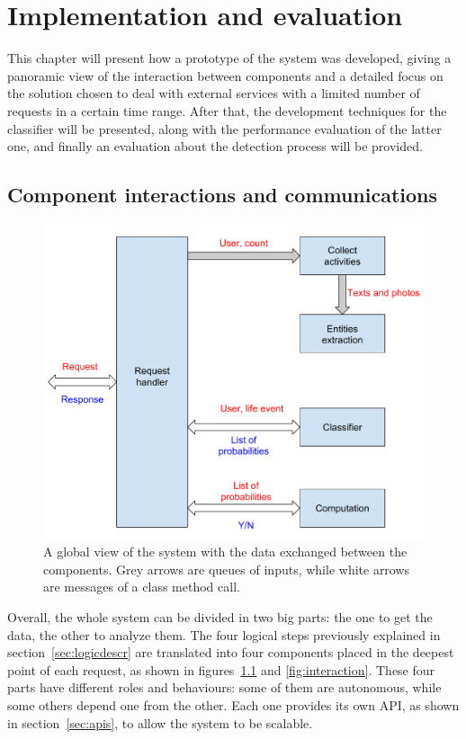 \chapter{Implementation and evaluation}
\label{cha:results}
This chapter will present how a prototype of the system was developed, giving a panoramic view of the interaction between components and a detailed focus on the solution chosen to deal with external services with a limited number of requests in a certain time range. After that, the development techniques for the classifier will be presented, along with the performance evaluation of the latter one, and finally an evaluation about the detection process will be provided.

\section{Component interactions and communications}
\label{sec:view}
\begin{figure}
\centering
\includegraphics[width=%
1.0\textwidth]{img/Globalview}
\caption{A global view of the system with the data exchanged between the components. Grey arrows are queues of inputs, while white arrows are messages of a class method call.}
\label{fig:globalview}
\end{figure}

Overall, the whole system can be divided in two big parts: the one to get the data, the other to analyze them. The four logical steps previously explained in section~\ref{sec:logicdescr} are translated into four components placed in the deepest point of each request, as shown in figures~\ref{fig:globalview} and \ref{fig:interaction}. These four parts have different roles and behaviours: some of them are autonomous, while some others depend one from the other. Each one provides its own API, as shown in section~\ref{sec:apis}, to allow the system to be scalable.

